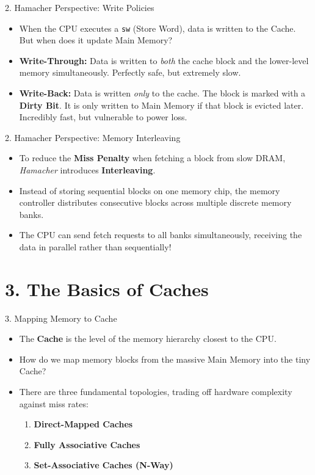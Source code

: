 \documentclass[aspectratio=169]{beamer}
\begin{document}
\begin{frame}{2. Hamacher Perspective: Write Policies}
\begin{itemize}
    \item When the CPU executes a \texttt{sw} (Store Word), data is written to the Cache. But when does it update Main Memory?
    \vspace{0.3cm}
    \item \textbf{Write-Through:} Data is written to \textit{both} the cache block and the lower-level memory simultaneously. Perfectly safe, but extremely slow.
    \vspace{0.3cm}
    \item \textbf{Write-Back:} Data is written \textit{only} to the cache. The block is marked with a \textbf{Dirty Bit}. It is only written to Main Memory if that block is evicted later. Incredibly fast, but vulnerable to power loss.
\end{itemize}
\end{frame}

\begin{frame}{2. Hamacher Perspective: Memory Interleaving}
\begin{itemize}
    \item To reduce the \textbf{Miss Penalty} when fetching a block from slow DRAM, \textit{Hamacher} introduces \textbf{Interleaving}.
    \vspace{0.3cm}
    \item Instead of storing sequential blocks on one memory chip, the memory controller distributes consecutive blocks across multiple discrete memory banks.
    \vspace{0.3cm}
    \item The CPU can send fetch requests to all banks simultaneously, receiving the data in parallel rather than sequentially!
\end{itemize}
\end{frame}

\section{3. The Basics of Caches}

\begin{frame}{3. Mapping Memory to Cache}
\begin{itemize}
    \item The \textbf{Cache} is the level of the memory hierarchy closest to the CPU.
    \item How do we map memory blocks from the massive Main Memory into the tiny Cache?
    \item There are three fundamental topologies, trading off hardware complexity against miss rates:
    \begin{enumerate}
        \item \textbf{Direct-Mapped Caches}
        \item \textbf{Fully Associative Caches}
        \item \textbf{Set-Associative Caches (N-Way)}
    \end{enumerate}
\end{itemize}
\end{frame}
\end{document}
